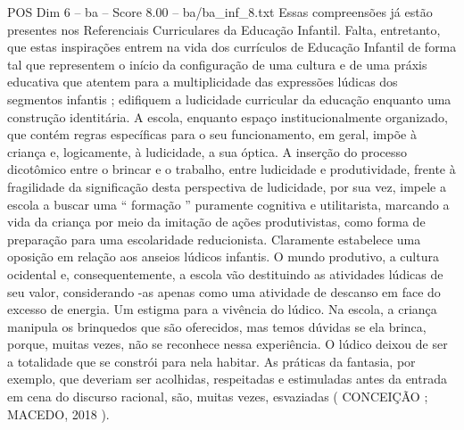 \begin{textsample}{POS Dim 6 – ba – Score 8.00 – ba/ba\_inf\_8.txt}
Essas compreensões já estão presentes nos Referenciais Curriculares da Educação Infantil.
Falta, entretanto, que estas inspirações entrem na vida dos currículos de Educação Infantil de forma tal que representem o início da configuração de uma cultura e de uma práxis educativa que atentem para a multiplicidade das expressões lúdicas dos segmentos infantis ; edifiquem a ludicidade curricular da educação enquanto uma construção identitária.
A escola, enquanto espaço institucionalmente organizado, que contém regras específicas para o seu funcionamento, em geral, impõe à criança e, logicamente, à ludicidade, a sua óptica.
A inserção do processo dicotômico entre o brincar e o trabalho, entre ludicidade e produtividade, frente à fragilidade da significação desta perspectiva de ludicidade, por sua vez, impele a escola a buscar uma “ formação ” puramente cognitiva e utilitarista, marcando a vida da criança por meio da imitação de ações produtivistas, como forma de preparação para uma escolaridade reducionista.
Claramente estabelece uma oposição em relação aos anseios lúdicos infantis.
O mundo produtivo, a cultura ocidental e, consequentemente, a escola vão destituindo as atividades lúdicas de seu valor, considerando -as apenas como uma atividade de descanso em face do excesso de energia.
Um estigma para a vivência do lúdico.
Na escola, a criança manipula os brinquedos que são oferecidos, mas temos dúvidas se ela brinca, porque, muitas vezes, não se reconhece nessa experiência.
O lúdico deixou de ser a totalidade que se constrói para nela habitar.
As práticas da fantasia, por exemplo, que deveriam ser acolhidas, respeitadas e estimuladas antes da entrada em cena do discurso racional, são, muitas vezes, esvaziadas ( CONCEIÇÃO ; MACEDO, 2018 ).

\end{textsample}
